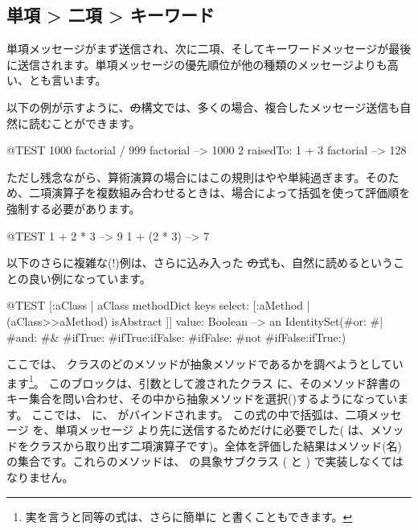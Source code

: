 \documentclass[a4paper,10pt,twoside]{book}
\begin{document}
\subsection*{単項 > 二項 > キーワード}
単項メッセージがまず送信され、次に二項、そしてキーワードメッセージが最後に送信されます。単項メッセージの優先順位が他の種類のメッセージよりも高い、とも言います。


以下の例が示すように、\st の構文では、多くの場合、複合したメッセージ送信も自然に読むことができます。
\begin{code}{@TEST}
1000 factorial / 999 factorial --> 1000
2 raisedTo: 1 + 3 factorial     --> 128
\end{code}
\noindent

ただし残念ながら、算術演算の場合にはこの規則はやや単純過ぎます。そのため、二項演算子を複数組み合わせるときは、場合によって括弧を使って評価順を強制する必要があります。
\begin{code}{@TEST}
1 + 2 * 3   --> 9
1 + (2 * 3) --> 7
\end{code}

以下のさらに複雑な(!)例は、さらに込み入った \st の式も、自然に読めるということの良い例になっています。
\begin{code}{@TEST}
[:aClass | aClass methodDict keys select: [:aMethod | (aClass>>aMethod) isAbstract ]] value: Boolean --> an IdentitySet(#or: #| #and: #& #ifTrue: #ifTrue:ifFalse: #ifFalse: #not #ifFalse:ifTrue:)
\end{code}
\noindent
ここでは、 クラスのどのメソッドが抽象メソッドであるかを調べようとしています\footnote{実を言うと同等の式は、さらに簡単に  と書くこともできます。}。
このブロックは、引数として渡されたクラス  に、そのメソッド辞書のキー集合を問い合わせ、その中から抽象メソッドを選択()するようになっています。
ここでは、 に、 がバインドされます。
この式の中で括弧は、二項メッセージ \ct{>>} を、単項メッセージ \mbox{} より先に送信するためだけに必要でした(\ct{>>} は、メソッドをクラスから取り出す二項演算子です)。全体を評価した結果はメソッド(名)の集合です。これらのメソッドは、 の具象サブクラス ( と ) で実装しなくてはなりません。
\end{document}
